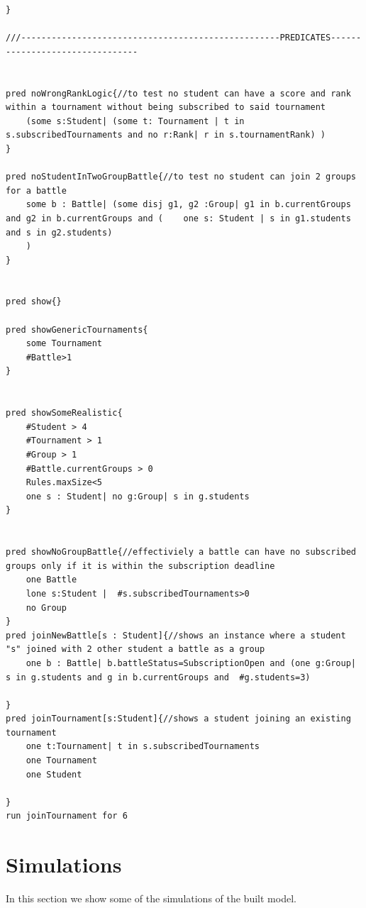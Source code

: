 \begin{lstlisting}[language=alloy,label={lst:alloy_code}]
}

///---------------------------------------------------PREDICATES--------------------------------


pred noWrongRankLogic{//to test no student can have a score and rank within a tournament without being subscribed to said tournament
	(some s:Student| (some t: Tournament | t in s.subscribedTournaments and no r:Rank| r in s.tournamentRank) )
}

pred noStudentInTwoGroupBattle{//to test no student can join 2 groups for a battle
	some b : Battle| (some disj g1, g2 :Group| g1 in b.currentGroups and g2 in b.currentGroups and (	one s: Student | s in g1.students and s in g2.students) 
	)
}


pred show{}

pred showGenericTournaments{
	some Tournament
	#Battle>1
}


pred showSomeRealistic{
	#Student > 4
	#Tournament > 1
	#Group > 1
	#Battle.currentGroups > 0
	Rules.maxSize<5
	one s : Student| no g:Group| s in g.students 
}


pred showNoGroupBattle{//effectiviely a battle can have no subscribed groups only if it is within the subscription deadline
	one Battle 
	lone s:Student |  #s.subscribedTournaments>0
	no Group
}
pred joinNewBattle[s : Student]{//shows an instance where a student "s" joined with 2 other student a battle as a group
	one b : Battle| b.battleStatus=SubscriptionOpen and (one g:Group| s in g.students and g in b.currentGroups and  #g.students=3)

}
pred joinTournament[s:Student]{//shows a student joining an existing tournament 
	one t:Tournament| t in s.subscribedTournaments
	one Tournament
	one Student

}
run joinTournament for 6
\end{lstlisting}


\section{Simulations}
In this section we show some of the simulations of the built model.



